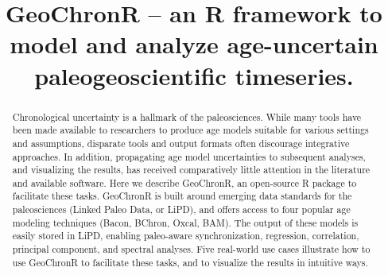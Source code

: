 \documentclass[gc, manuscript]{copernicus}
\begin{document}
\title{GeoChronR -- an R framework to model and analyze age-uncertain
paleogeoscientific timeseries.}














\received{}
\pubdiscuss{} %
\revised{}
\accepted{}
\published{}




\maketitle


\begin{abstract}
Chronological uncertainty is a hallmark of the paleosciences. While many
tools have been made available to researchers to produce age models
suitable for various settings and assumptions, disparate tools and
output formats often discourage integrative approaches. In addition,
propagating age model uncertainties to subsequent analyses, and
visualizing the results, has received comparatively little attention in
the literature and available software. Here we describe GeoChronR, an
open-source R package to facilitate these tasks. GeoChronR is built
around emerging data standards for the paleosciences (Linked Paleo Data,
or LiPD), and offers access to four popular age modeling techniques
(Bacon, BChron, Oxcal, BAM). The output of these models is easily stored
in LiPD, enabling paleo-aware synchronization, regression, correlation,
principal component, and spectral analyses. Five real-world use cases
illustrate how to use GeoChronR to facilitate these tasks, and to
visualize the results in intuitive ways.
\end{abstract}
\end{document}
